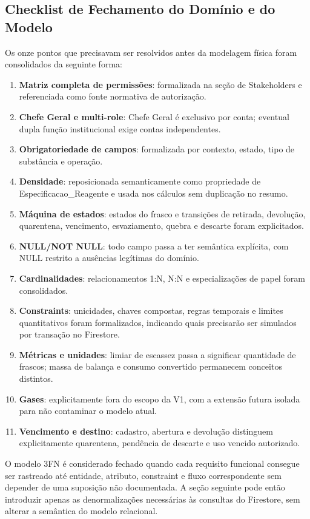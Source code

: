 \subsection{Checklist de Fechamento do Domínio e do Modelo}
Os onze pontos que precisavam ser resolvidos antes da modelagem física foram consolidados da seguinte forma:
\begin{enumerate}
    \item \textbf{Matriz completa de permissões}: formalizada na seção de Stakeholders e referenciada como fonte normativa de autorização.
    \item \textbf{Chefe Geral e multi-role}: Chefe Geral é exclusivo por conta; eventual dupla função institucional exige contas independentes.
    \item \textbf{Obrigatoriedade de campos}: formalizada por contexto, estado, tipo de substância e operação.
    \item \textbf{Densidade}: reposicionada semanticamente como propriedade de Especificacao\_Reagente e usada nos cálculos sem duplicação no resumo.
    \item \textbf{Máquina de estados}: estados do frasco e transições de retirada, devolução, quarentena, vencimento, esvaziamento, quebra e descarte foram explicitados.
    \item \textbf{NULL/NOT NULL}: todo campo passa a ter semântica explícita, com NULL restrito a ausências legítimas do domínio.
    \item \textbf{Cardinalidades}: relacionamentos 1:N, N:N e especializações de papel foram consolidados.
    \item \textbf{Constraints}: unicidades, chaves compostas, regras temporais e limites quantitativos foram formalizados, indicando quais precisarão ser simulados por transação no Firestore.
    \item \textbf{Métricas e unidades}: limiar de escassez passa a significar quantidade de frascos; massa de balança e consumo convertido permanecem conceitos distintos.
    \item \textbf{Gases}: explicitamente fora do escopo da V1, com a extensão futura isolada para não contaminar o modelo atual.
    \item \textbf{Vencimento e destino}: cadastro, abertura e devolução distinguem explicitamente quarentena, pendência de descarte e uso vencido autorizado.
\end{enumerate}

\begin{explicacao}
O modelo 3FN é considerado fechado quando cada requisito funcional consegue ser rastreado até entidade, atributo, constraint e fluxo correspondente sem depender de uma suposição não documentada. A seção seguinte pode então introduzir apenas as denormalizações necessárias às consultas do Firestore, sem alterar a semântica do modelo relacional.
\end{explicacao}

